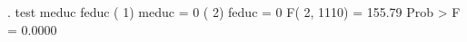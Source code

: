 . test meduc feduc
{\smallskip}
 ( 1)  meduc = 0
 ( 2)  feduc = 0
{\smallskip}
       F(  2,  1110) =  155.79
            Prob > F =    0.0000
{\smallskip}
